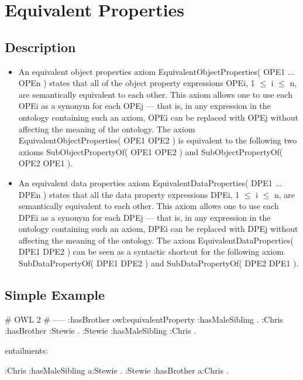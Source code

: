 \documentclass{llncs}
\begin{document}
\section{Equivalent Properties}

\subsection{Description}

\begin{itemize}
	\item An equivalent object properties axiom EquivalentObjectProperties( OPE1 ... OPEn ) states that all of the object property expressions OPEi, 1 $\leq$ i $\leq$ n, are semantically equivalent to each other. This axiom allows one to use each OPEi as a synonym for each OPEj — that is, in any expression in the ontology containing such an axiom, OPEi can be replaced with OPEj without affecting the meaning of the ontology. The axiom EquivalentObjectProperties( OPE1 OPE2 ) is equivalent to the following two axioms SubObjectPropertyOf( OPE1 OPE2 ) and SubObjectPropertyOf( OPE2 OPE1 ).
	\item An equivalent data properties axiom EquivalentDataProperties( DPE1 ... DPEn ) states that all the data property expressions DPEi, 1 $\leq$ i $\leq$ n, are semantically equivalent to each other. This axiom allows one to use each DPEi as a synonym for each DPEj — that is, in any expression in the ontology containing such an axiom, DPEi can be replaced with DPEj without affecting the meaning of the ontology. The axiom EquivalentDataProperties( DPE1 DPE2 ) can be seen as a syntactic shortcut for the following axiom SubDataPropertyOf( DPE1 DPE2 ) and SubDataPropertyOf( DPE2 DPE1 ).

\end{itemize}

\subsection{Simple Example}

\begin{ex}
# OWL 2
# -----
:hasBrother owl:equivalentProperty :hasMaleSibling . 
:Chris :hasBrother :Stewie . 
:Stewie :hasMaleSibling :Chris .
\end{ex}

entailments:

\begin{ex}
:Chris :hasMaleSibling a:Stewie . 
:Stewie :hasBrother a:Chris .
\end{ex}
\end{document}
